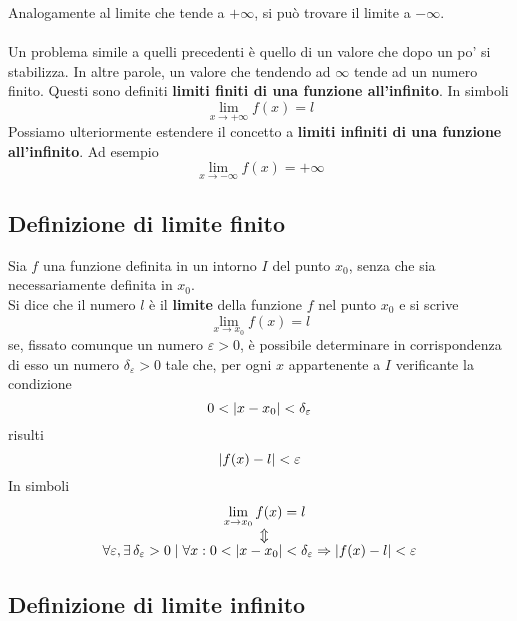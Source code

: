 Analogamente al limite che tende a $+\infty$, si può trovare il limite a $-\infty$.\\\\
Un problema simile a quelli precedenti è quello di un valore che dopo un po' si stabilizza. In altre
parole, un valore che tendendo ad $\infty$ tende ad un numero finito. Questi sono definiti \textbf{
limiti finiti di una funzione all'infinito}. In simboli
\begin{equation*}
  \lim\limits_{x\to+\infty}f(x)=l
\end{equation*}
Possiamo ulteriormente estendere il concetto a \textbf{limiti infiniti di una funzione all'infinito}.
Ad esempio
\begin{equation*}
  \lim\limits_{x\to-\infty}f(x)=+\infty
\end{equation*}


\subsection{Definizione di limite finito}
\begin{definizioneLimiteFinito}
  Sia $f$ una funzione definita in un intorno $I$ del punto $x_0$, senza che sia necessariamente
  definita in $x_0$.\\
  Si dice che il numero $l$ è il \textbf{limite} della funzione $f$ nel punto $x_0$ e si scrive
  \begin{equation*}
    \lim\limits_{x\to x_0}f(x)=l
  \end{equation*}
  se, fissato comunque un numero $\varepsilon>0$, è possibile determinare in corrispondenza di esso 
  un numero $\delta_\varepsilon>0$ tale che, per ogni $x$ appartenente a $I$ verificante la 
  condizione
  \begin{equation*}
    0<\lvert x-x_0\rvert<\delta_\varepsilon
  \end{equation*}
  risulti
  \begin{equation*}
    \lvert f(x)-l\rvert<\varepsilon
  \end{equation*}
  In simboli
  \begin{align*}
    \lim\limits_{x\to x_0} f(x) &= l\\
    \ArrowBetweenLines
    \forall \varepsilon, \exists\,\delta_\varepsilon>0\mid\forall x: 0<\vert x-x_0\vert 
    &<\delta_\varepsilon \Rightarrow \vert f(x) - l\vert < \varepsilon
  \end{align*}
\end{definizioneLimiteFinito}

\subsection{Definizione di limite infinito}
